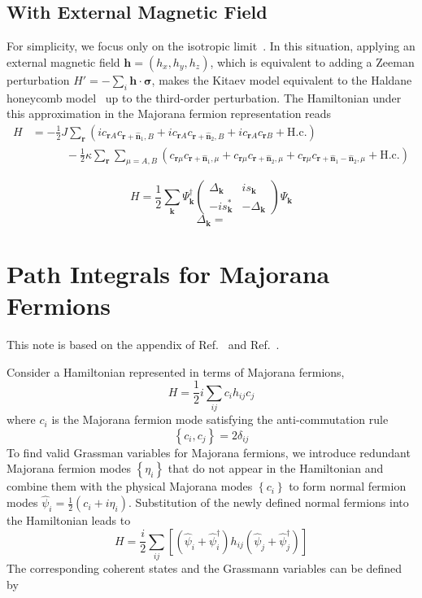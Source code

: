 \documentclass[12font]{article}
\numberwithin{equation}{section}    %
\theoremstyle{definition}
\newcommand{\lr}[1]{\left(  #1  \right)}
\newcommand{\lrm}[1]{\left[  #1  \right]}
\newcommand{\lrg}[1]{\left\{  #1  \right\}}
\newcommand{\mrm}[1]{\mathrm{#1}}
\newcommand{\bo}[1]{\mathbf{#1}}
\newcommand{\bog}[1]{\boldsymbol{#1}}
\begin{document}
\subsection{With External Magnetic Field}
For simplicity, we focus only on the isotropic limit~\cite{Kitaev_2006}. In this situation, applying an external magnetic field $\bo{h} = \lr{h_x,h_y,h_z}$, which is equivalent to adding a Zeeman perturbation $H' = -\sum_{i}\bo{h}\cdot\bog{\sigma}$, makes the Kitaev model equivalent to the Haldane honeycomb model~\cite{Haldane_1988} up to the third-order perturbation. The Hamiltonian under this approximation in the Majorana fermion representation reads
\begin{align*}
    H 
    &= 
    -\frac{1}{2}J\sum_{\bo{r}}
    \lr{
        ic_{\bo{r}A}c_{\bo{r}+\hat{\bo{n}}_1,B} 
        + 
        ic_{\bo{r}A}c_{\bo{r}+\hat{\bo{n}}_2,B}
        +
        ic_{\bo{r}A}c_{\bo{r}B}
        +\mrm{H.c.}
    } \\
    &\quad\quad\quad
    - 
    \frac{1}{2}\kappa
    \sum_{\bo{r}}\sum_{\mu = A,B}
    \lr{
        c_{\bo{r}\mu}c_{\bo{r}+\hat{\bo{n}}_1,\mu}
        +
        c_{\bo{r}\mu}c_{\bo{r}+\hat{\bo{n}}_2,\mu}
        +
        c_{\bo{r}\mu}c_{\bo{r}+\hat{\bo{n}}_1-\hat{\bo{n}}_2,\mu}
        +
        \mrm{H.c.}
    }
\end{align*}

\[
H = 
\frac{1}{2}
\sum_{\bo{k}}
\Psi_{\bo{k}}^\dagger
\begin{pmatrix}
  \Delta_{\bo{k}} & is_{\bo{k}} \\
  -is_{\bo{k}}^* & -\Delta_{\bo{k}}
\end{pmatrix}
\Psi_{\bo{k}}
\]
\[
\Delta_{\bo{k}} = 
\]

\section{Path Integrals for Majorana Fermions}
This note is based on the appendix of Ref.~\cite{Petrova-Mellado-Tchernychyov_2014} and Ref.~\cite{Shankar_2017}.

Consider a Hamiltonian represented in terms of Majorana fermions,
\[
H = \frac{1}{2} i \sum_{ij} c_i h_{ij} c_{j}
\]
where $c_i$ is the Majorana fermion mode satisfying the anti-commutation rule
\[
\lrg{c_i, c_j} = 2\delta_{ij}
\]
To find valid Grassman variables for Majorana fermions, we introduce redundant Majorana fermion modes $\lrg{\eta_i}$ that do not appear in the Hamiltonian and combine them with the physical Majorana modes $\lrg{c_i}$ to form normal fermion modes $\hat{\psi}_i = \frac{1}{2}\lr{c_i + i\eta_i}$. Substitution of the newly defined normal fermions into the Hamiltonian leads to
\[
H = \frac{i}{2} \sum_{ij} 
\lrm{\lr{\hat{\psi}_i + \hat{\psi}^\dagger_i} h_{ij} \lr{\hat{\psi}_j + \hat{\psi}^\dagger_j}}
\]
The corresponding coherent states and the Grassmann variables can be defined by
\end{document}
